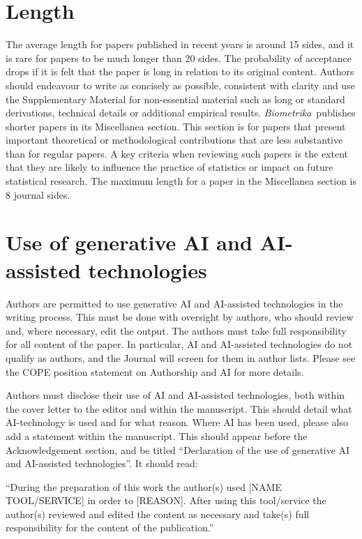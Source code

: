 \documentclass[lineno]{biometrika}
\def\Bka{{\it Biometrika}}
\begin{document}
\section{Length}

The average length for papers published in recent years is around 15 sides, and it is rare for papers to be much longer than 20 sides. The probability of acceptance drops if it is felt that the paper is long in relation to its original content. Authors should endeavour to write as concisely as possible, consistent with clarity and use the Supplementary Material for non-essential material such as long or standard derivations, technical details or additional empirical results.
\Bka\ publishes shorter papers in its Miscellanea section. This section is for papers that present important theoretical or methodological contributions that are less substantive than for regular papers. A key criteria when reviewing such papers is the extent that they are likely to influence the practice of statistics or impact on future statistical research. The maximum length for a paper in the Miscellanea section is 8 journal sides. 


\section{Use of generative AI and AI-assisted technologies}
Authors are permitted to use generative AI and AI-assisted technologies in the writing process. This must be done with oversight by authors, who should review and, where necessary, edit the output. The authors must take full responsibility for all content of the paper. In particular, AI and AI-assisted technologies do not qualify as authors, and the Journal will screen for them in author lists. Please see the COPE position statement on Authorship and AI for more details.
 
Authors must disclose their use of AI and AI-assisted technologies, both within the cover letter to the editor and within the manuscript. This should detail what AI-technology is used and for what reason. Where AI has been used, please also add a statement within the manuscript. This should appear before the Acknowledgement section, and be titled ``Declaration of the use of generative AI and AI-assisted technologies''. It should read:
 
``During the preparation of this work the author(s) used [NAME TOOL/SERVICE] in order to [REASON]. After using this tool/service the author(s) reviewed and edited the content as necessary and take(s) full responsibility for the content of the publication.''
 
\end{document}
